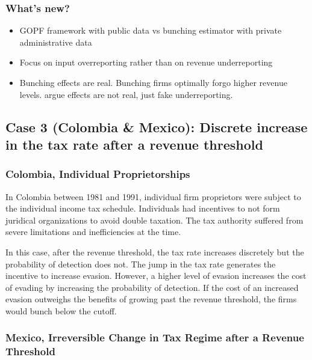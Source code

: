 \documentclass[
  12pt]{article}
\providecommand{\tightlist}{%
  \setlength{\itemsep}{0pt}\setlength{\parskip}{0pt}}\usepackage{longtable,booktabs,array}
\theoremstyle{definition}
\theoremstyle{remark}
\begin{document}
\subsubsection{What's new?}\label{whats-new}

\begin{itemize}
\tightlist
\item
  GOPF framework with public data vs bunching estimator with private
  administrative data
\item
  Focus on input overreporting rather than on revenue underreporting
\item
  Bunching effects are real. Bunching firms optimally forgo higher
  revenue levels. \citet{Almunia2018} argue effects are not real, just
  fake underreporting.
\end{itemize}

\subsection{Case 3 (Colombia \& Mexico): Discrete increase in the tax
rate after a revenue
threshold}\label{case-3-colombia-mexico-discrete-increase-in-the-tax-rate-after-a-revenue-threshold}

\subsubsection{Colombia, Individual
Proprietorships}\label{colombia-individual-proprietorships}

In Colombia between 1981 and 1991, individual firm proprietors were
subject to the individual income tax schedule. Individuals had
incentives to not form juridical organizations to avoid double taxation.
The tax authority suffered from severe limitations and inefficiencies at
the time.

In this case, after the revenue threshold, the tax rate increases
discretely but the probability of detection does not. The jump in the
tax rate generates the incentive to increase evasion. However, a higher
level of evasion increases the cost of evading by increasing the
probability of detection. If the cost of an increased evasion outweighs
the benefits of growing past the revenue threshold, the firms would
bunch below the cutoff.

\subsubsection{Mexico, Irreversible Change in Tax Regime after a Revenue
Threshold}\label{mexico-irreversible-change-in-tax-regime-after-a-revenue-threshold}
\end{document}

